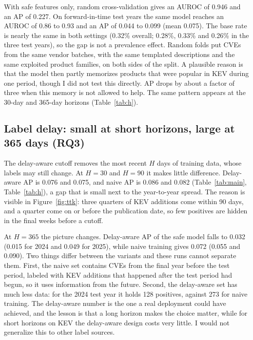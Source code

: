 \documentclass[11pt,a4paper]{article}
\begin{document}
With safe features only, random cross-validation gives an AUROC of 0.946 and an AP of 0.227. On forward-in-time test years the same model reaches an AUROC of 0.86 to 0.93 and an AP of 0.044 to 0.099 (mean 0.075). The base rate is nearly the same in both settings (0.32\% overall; 0.28\%, 0.33\% and 0.26\% in the three test years), so the gap is not a prevalence effect. Random folds put CVEs from the same vendor batches, with the same templated descriptions and the same exploited product families, on both sides of the split. A plausible reason is that the model then partly memorizes products that were popular in KEV during one period, though I did not test this directly. AP drops by about a factor of three when this memory is not allowed to help. The same pattern appears at the 30-day and 365-day horizons (Table~\ref{tab:h}).

\subsection{Label delay: small at short horizons, large at 365 days (RQ3)}

The delay-aware cutoff removes the most recent $H$ days of training data, whose labels may still change. At $H=30$ and $H=90$ it makes little difference. Delay-aware AP is 0.076 and 0.075, and naive AP is 0.086 and 0.082 (Table~\ref{tab:main}, Table~\ref{tab:h}), a gap that is small next to the year-to-year spread. The reason is visible in Figure~\ref{fig:ttk}: three quarters of KEV additions come within 90 days, and a quarter come on or before the publication date, so few positives are hidden in the final weeks before a cutoff.

At $H=365$ the picture changes. Delay-aware AP of the safe model falls to 0.032 (0.015 for 2024 and 0.049 for 2025), while naive training gives 0.072 (0.055 and 0.090). Two things differ between the variants and these runs cannot separate them. First, the naive set contains CVEs from the final year before the test period, labeled with KEV additions that happened after the test period had begun, so it uses information from the future. Second, the delay-aware set has much less data: for the 2024 test year it holds 128 positives, against 273 for naive training. The delay-aware number is the one a real deployment could have achieved, and the lesson is that a long horizon makes the choice matter, while for short horizons on KEV the delay-aware design costs very little. I would not generalize this to other label sources.
\end{document}
